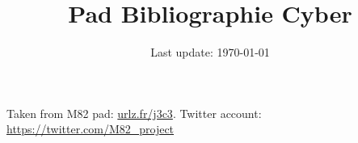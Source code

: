 \documentclass[12pt,a4paper]{article}
\author{Last update: \today}
\title{Pad Bibliographie Cyber}
\date{}
\begin{document}
\maketitle
\thispagestyle{empty}
Taken from M82 pad: \url{urlz.fr/j3c3}. Twitter account: \url{https://twitter.com/M82_project}\nocite{*}
\renewcommand{\thepage}{}


\end{document}
